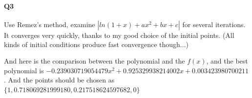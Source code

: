 \documentclass[11pt]{article}
\begin{document}
\paragraph{Q3}
Use Remez's method, examine $|ln(1+x)+ax^2+bx+c|$ for several iterations. It converges very quickly, thanks to my good choice of the initial points. (All kinds of initial conditions produce fast convergence though...)
\begin{figure}[H]
	\centering
\end{figure}
And here is the comparison between the polynomial and the $f(x)$, and the best polynomial is $-0.239030719054479x^2+0.925329938214002x+0.003423980700211$. And the points should be chosen as $\{1,   0.718069281999180,0.217518624597682,0\}$
\end{document}
